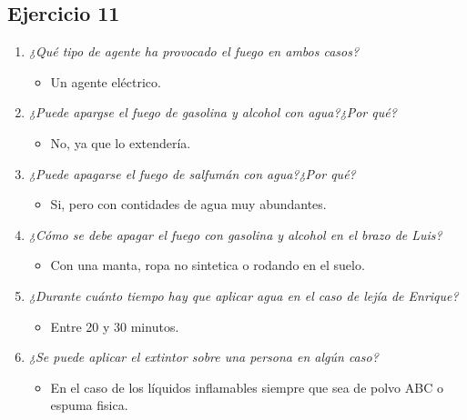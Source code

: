 \documentclass{article}
\begin{document}
      \subsection{Ejercicio 11}
        \begin{enumerate}[label=(\alph*)]
          \item \textit{¿Qué tipo de agente ha provocado el fuego en ambos casos?}
            \begin{itemize}
              \item Un agente eléctrico.
            \end{itemize}
          \item \textit{¿Puede apargse el fuego de gasolina y alcohol con agua?¿Por qué?}
            \begin{itemize}
              \item No, ya que lo extendería.
            \end{itemize}
          \item \textit{¿Puede apagarse el fuego de salfumán con agua?¿Por qué?}
            \begin{itemize}
              \item Si, pero con contidades de agua muy abundantes.
            \end{itemize}
          \item \textit{¿Cómo se debe apagar el fuego con gasolina y alcohol en el brazo de Luis?}
            \begin{itemize}
              \item Con una manta, ropa no sintetica o rodando en el suelo.
            \end{itemize}
          \item \textit{¿Durante cuánto tiempo hay que aplicar agua en el caso de lejía de Enrique?}
            \begin{itemize}
              \item Entre 20 y 30 minutos.
            \end{itemize}
          \item \textit{¿Se puede aplicar el extintor sobre una persona en algún caso?}
            \begin{itemize}
              \item En el caso de los líquidos inflamables siempre que sea de polvo ABC o espuma fisica.
            \end{itemize}
        \end{enumerate}
\end{document}
